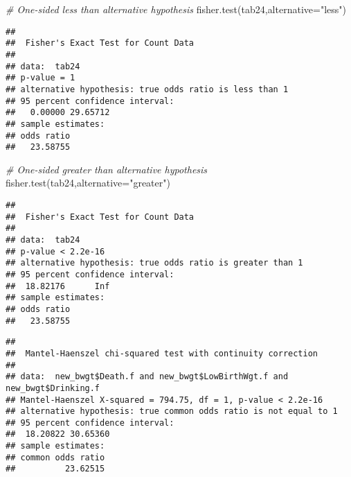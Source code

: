 \documentclass[
]{article}
\newenvironment{Shaded}{\begin{snugshade}}{\end{snugshade}}
\newcommand{\AttributeTok}[1]{\textcolor[rgb]{0.77,0.63,0.00}{#1}}
\newcommand{\CommentTok}[1]{\textcolor[rgb]{0.56,0.35,0.01}{\textit{#1}}}
\newcommand{\FunctionTok}[1]{\textcolor[rgb]{0.00,0.00,0.00}{#1}}
\newcommand{\NormalTok}[1]{#1}
\newcommand{\SpecialCharTok}[1]{\textcolor[rgb]{0.00,0.00,0.00}{#1}}
\newcommand{\StringTok}[1]{\textcolor[rgb]{0.31,0.60,0.02}{#1}}
\begin{document}
\begin{Shaded}
\begin{Highlighting}[]
\CommentTok{\# One{-}sided less than alternative hypothesis}
\FunctionTok{fisher.test}\NormalTok{(tab24,}\AttributeTok{alternative=}\StringTok{"less"}\NormalTok{)}
\end{Highlighting}
\end{Shaded}

\begin{verbatim}
## 
##  Fisher's Exact Test for Count Data
## 
## data:  tab24
## p-value = 1
## alternative hypothesis: true odds ratio is less than 1
## 95 percent confidence interval:
##   0.00000 29.65712
## sample estimates:
## odds ratio 
##   23.58755
\end{verbatim}

\begin{Shaded}
\begin{Highlighting}[]
\CommentTok{\# One{-}sided greater than alternative hypothesis}
\FunctionTok{fisher.test}\NormalTok{(tab24,}\AttributeTok{alternative=}\StringTok{"greater"}\NormalTok{)}
\end{Highlighting}
\end{Shaded}

\begin{verbatim}
## 
##  Fisher's Exact Test for Count Data
## 
## data:  tab24
## p-value < 2.2e-16
## alternative hypothesis: true odds ratio is greater than 1
## 95 percent confidence interval:
##  18.82176      Inf
## sample estimates:
## odds ratio 
##   23.58755
\end{verbatim}

\begin{Shaded}
\end{Shaded}

\begin{verbatim}
## 
##  Mantel-Haenszel chi-squared test with continuity correction
## 
## data:  new_bwgt$Death.f and new_bwgt$LowBirthWgt.f and new_bwgt$Drinking.f
## Mantel-Haenszel X-squared = 794.75, df = 1, p-value < 2.2e-16
## alternative hypothesis: true common odds ratio is not equal to 1
## 95 percent confidence interval:
##  18.20822 30.65360
## sample estimates:
## common odds ratio 
##          23.62515
\end{verbatim}
\end{document}
